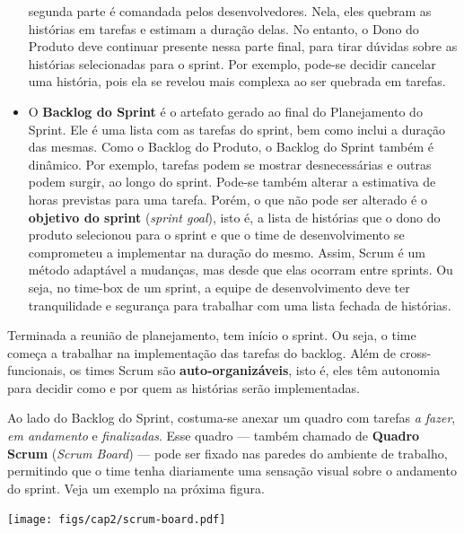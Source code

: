 \documentclass[
  11pt,
  twoside]{book}
\let\origfigure\figure
\let\endorigfigure\endfigure
\renewenvironment{figure}[1][2] {
    \expandafter\origfigure\expandafter[!h]
} {
    \endorigfigure
}
\begin{document}
\begin{itemize}
  segunda parte é comandada pelos desenvolvedores. Nela, eles quebram as
  histórias em tarefas e estimam a duração delas. No entanto, o Dono do
  Produto deve continuar presente nessa parte final, para tirar dúvidas
  sobre as histórias selecionadas para o sprint. Por exemplo, pode-se
  decidir cancelar uma história, pois ela se revelou mais complexa ao
  ser quebrada em tarefas.
\item
  O \textbf{Backlog do Sprint} é 
   o artefato gerado ao final do
  Planejamento do Sprint. Ele é uma lista com as tarefas do sprint, bem
  como inclui a duração das mesmas. Como o Backlog do Produto, o Backlog
  do Sprint também é dinâmico. Por exemplo, tarefas podem se mostrar
  desnecessárias e outras podem surgir, ao longo do sprint. Pode-se
  também alterar a estimativa de horas previstas para uma tarefa. Porém,
  o que não pode ser alterado é o \textbf{objetivo do sprint}
  (\emph{sprint goal}), isto é, a lista de histórias que o dono do
  produto selecionou para o sprint e que o time de desenvolvimento se
  comprometeu a implementar na duração do mesmo. Assim, Scrum é um
  método adaptável a mudanças, mas desde que elas ocorram entre sprints.
  Ou seja, no time-box de um sprint, a equipe de desenvolvimento deve
  ter tranquilidade e segurança para trabalhar com uma lista fechada de
  histórias.
\end{itemize}

Terminada a reunião de planejamento, tem início o sprint. Ou seja, o
time começa a trabalhar na implementação das tarefas do backlog. Além de
cross-funcionais, os times Scrum são \textbf{auto-organizáveis}, isto é,
eles têm autonomia para decidir como e por quem as histórias serão
implementadas.

  

Ao lado do Backlog do Sprint, costuma-se anexar um quadro com tarefas
\emph{a fazer}, \emph{em andamento} e \emph{finalizadas}. Esse quadro
--- também chamado de \textbf{Quadro} \textbf{Scrum} (\emph{Scrum
Board}) --- pode ser fixado nas paredes do ambiente de trabalho,
permitindo que o time tenha diariamente uma sensação visual sobre o
andamento do sprint. Veja um exemplo na próxima figura.

\begin{figure}
\centering
\texttt{[image: figs/cap2/scrum-board.pdf]}
\caption{Exemplo de Quadro Scrum, mostrando as histórias selecionadas
para o sprint e as tarefas nas quais elas foram quebradas. Cada tarefa
nesse quadro pode estar em um dos seguintes estados: a fazer, em
andamento, em teste ou concluída.}
\end{figure}
\end{document}
